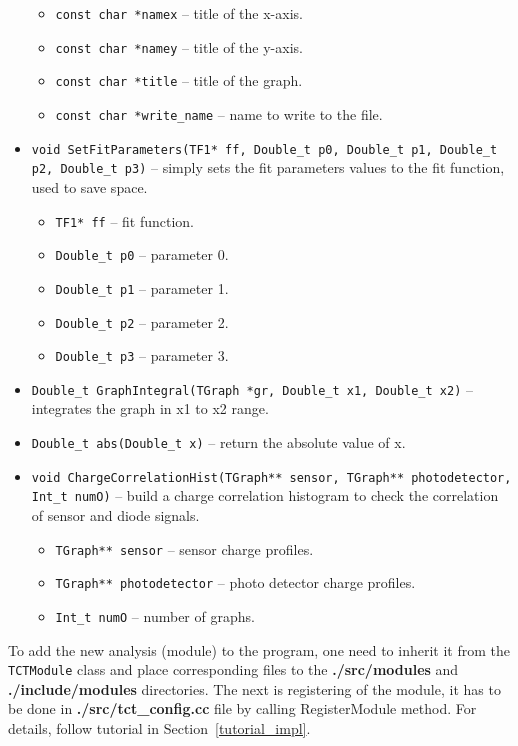 \documentclass[12pt,oneside,notitlepage,abstracton,a4paper]{scrartcl}
\begin{document}
\begin{itemize}
\begin{itemize}
\item \lstinline$const char *namex$ -- title of the x-axis.
\item \lstinline$const char *namey$ -- title of the y-axis.
\item \lstinline$const char *title$ -- title of the graph.
\item \lstinline$const char *write_name$ -- name to write to the file.
\end{itemize}
\item \lstinline$void SetFitParameters(TF1* ff, Double_t p0, Double_t p1, Double_t p2, Double_t p3)$ -- simply sets the fit parameters values to the fit function, used to save space.
\begin{itemize}
\item \lstinline$TF1* ff$ --  fit function.
\item \lstinline$Double_t p0$ -- parameter 0.
\item \lstinline$Double_t p1$ -- parameter 1.
\item \lstinline$Double_t p2$ -- parameter 2.  
\item \lstinline$Double_t p3$ -- parameter 3.
\end{itemize}
\item \lstinline$Double_t GraphIntegral(TGraph *gr, Double_t x1, Double_t x2)$ -- integrates the graph in x1 to x2 range.
\item \lstinline$Double_t abs(Double_t x)$ -- return the absolute value of x.
\item \lstinline$void ChargeCorrelationHist(TGraph** sensor, TGraph** photodetector, Int_t numO)$ -- build a charge correlation histogram to check the correlation of sensor and diode signals.
\begin{itemize}
\item \lstinline$TGraph** sensor$ --  sensor charge profiles.
\item \lstinline$TGraph** photodetector$ -- photo detector charge profiles.
\item \lstinline$Int_t numO$ -- number of graphs.
\end{itemize}
\end{itemize}

To add the new analysis (module) to the program, one need to inherit it from the \lstinline$TCTModule$ class and place corresponding files to the \textbf{./src/modules} and \textbf{./include/modules} directories. The next is registering of the module, it has to be done in \textbf{./src/tct\_config.cc} file by calling RegisterModule method. For details, follow tutorial in Section~\ref{tutorial_impl}.
\end{document}
